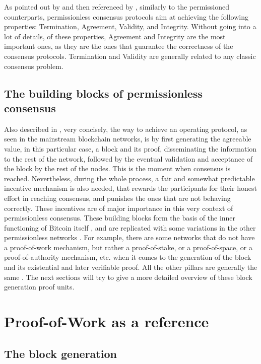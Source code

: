 \documentclass[journal]{IEEEtran}
\begin{document}
As pointed out by \cite{xiao2019distributed, 8629877} and then referenced by \cite{survey-dist-consensus}, 
similarly to the permissioned counterparts, permissionless consensus protocols 
aim at achieving the following properties: Termination, Agreement, Validity, 
and Integrity. Without going into a lot of details, of these properties, 
Agreement and Integrity are the most important ones, as they are the ones that
guarantee the correctness of the consensus protocols. Termination and Validity
are generally related to any classic consensus problem.

\subsection{The building blocks of permissionless consensus}

Also described in \cite{survey-dist-consensus}, very concisely, the 
way to achieve an operating protocol, as seen in the mainstream blockchain
networks, is by first generating the agreeable value, 
in this particular case, a block and its proof, disseminating the information 
to the rest of the network, followed by the eventual validation and 
acceptance of the block by the rest of the nodes. This is the moment when consensus is reached.
Nevertheless, during the whole process, a fair and somewhat predictable incentive mechanism 
is also needed, that rewards the participants for their honest effort in reaching consensus, and
punishes the ones that are not behaving correctly. These incentives are of major importance
in this very context of permissionless consensus. 
These building blocks form the basis of the inner functioning of Bitcoin itself \cite{nakamoto2008bitcoin},
and are replicated with some variations in the other permissionless networks \cite{buterin2014next}.
For example, there are some networks that do not have a proof-of-work mechanism,
but rather a proof-of-stake, or a proof-of-space, or a proof-of-authority mechanism, etc.
when it comes to the generation of the block and its existential and later verifiable proof.
All the other pillars are generally the same \cite{survey-dist-consensus}.
The next sections will try to give a more detailed overview of these 
block generation proof units.

\section{Proof-of-Work as a reference}

\subsection{The block generation}
\end{document}
